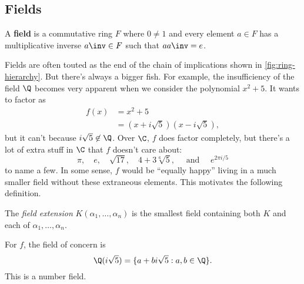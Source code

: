 \subsection{Fields}

\begin{definition}[Field]
    A \textbf{field} is a commutative ring $F$ where $0 \neq 1$ and every element $a \in F$ has a multiplicative inverse $a \inv \in F$ such that $a a \inv = e$.
\end{definition}

Fields are often touted as the end of the chain of implications shown in \autoref{fig:ring-hierarchy}. But there's always a bigger fish. For example, the insufficiency of the field $\Q$ becomes very apparent when we consider the polynomial $x^2 + 5$. It wants to factor as
\begin{equation}
    \begin{aligned}
        f(x) & = x^2 + 5                         \\
             & = (x + i \sqrt 5)(x - i \sqrt 5),
    \end{aligned}
\end{equation}
but it can't because $i \sqrt 5 \not \in \Q$. Over $\C$, $f$ does factor completely, but there's a lot of extra stuff in $\C$ that $f$ doesn't care about:
\begin{equation}
    \pi, \quad
    e, \quad
    \sqrt{17}, \quad
    4 + 3 \sqrt[6]{5}, \quad \text{ and } \quad
    e^{2 \pi i / 5}
\end{equation}
to name a few.
In some sense, $f$ would be ``equally happy'' living in a much smaller field without these extraneous elements. This motivates the following definition.

\begin{definition}
    The \emph{field extension} $K(\alpha_1, \ldots, \alpha_n)$ is the smallest field containing both $K$ and each of $\alpha_1, \ldots, \alpha_n$.
\end{definition}

For $f$, the field of concern is
\begin{equation}
    \Q(i \sqrt 5) = \{ a  + b i \sqrt 5 : a, b \in \Q \}.
\end{equation}
This is a number field.

